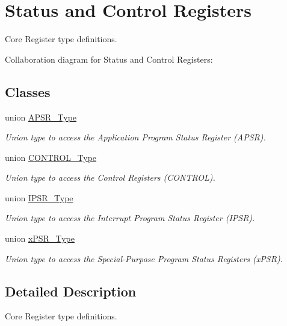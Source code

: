 \hypertarget{group__CMSIS__CORE}{}\section{Status and Control Registers}
\label{group__CMSIS__CORE}


Core Register type definitions.  


Collaboration diagram for Status and Control Registers\+:
\subsection*{Classes}
\begin{DoxyCompactItemize}
\item 
union \hyperlink{unionAPSR__Type}{A\+P\+S\+R\+\_\+\+Type}
\begin{DoxyCompactList}\small\item\em Union type to access the Application Program Status Register (A\+P\+SR). \end{DoxyCompactList}\item 
union \hyperlink{unionCONTROL__Type}{C\+O\+N\+T\+R\+O\+L\+\_\+\+Type}
\begin{DoxyCompactList}\small\item\em Union type to access the Control Registers (C\+O\+N\+T\+R\+OL). \end{DoxyCompactList}\item 
union \hyperlink{unionIPSR__Type}{I\+P\+S\+R\+\_\+\+Type}
\begin{DoxyCompactList}\small\item\em Union type to access the Interrupt Program Status Register (I\+P\+SR). \end{DoxyCompactList}\item 
union \hyperlink{unionxPSR__Type}{x\+P\+S\+R\+\_\+\+Type}
\begin{DoxyCompactList}\small\item\em Union type to access the Special-\/\+Purpose Program Status Registers (x\+P\+SR). \end{DoxyCompactList}\end{DoxyCompactItemize}


\subsection{Detailed Description}
Core Register type definitions. 

